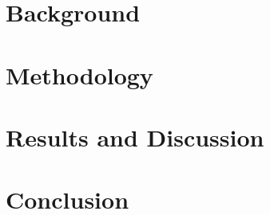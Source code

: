\documentclass[a4paper,12pt,twoside, openright]{book}
\begin{document}
\chapter{Background}
\label{ch:background}

\clearpage

\chapter{Methodology}
\label{ch:methodology}

\clearpage

\chapter{Results and Discussion}
\label{ch:results_and_discussion}

\clearpage

\chapter{Conclusion}
\label{ch:conclusion}

\clearpage

\nocite{*}



 
\end{document}
